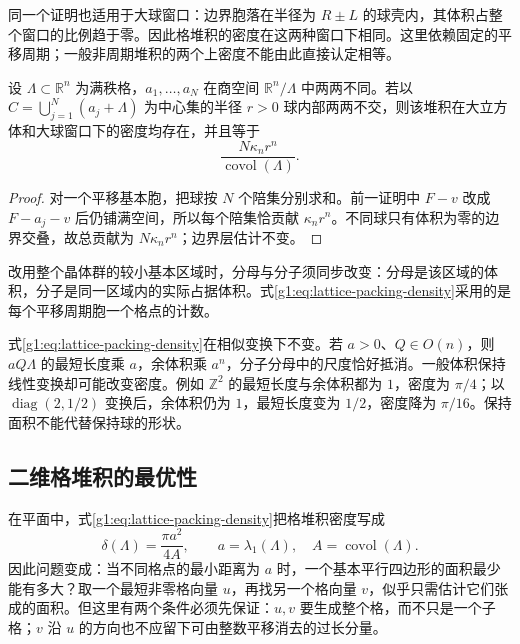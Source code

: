 同一个证明也适用于大球窗口：边界胞落在半径为 \(R\pm L\) 的球壳内，其体积占整个窗口的比例趋于零。因此格堆积的密度在这两种窗口下相同。这里依赖固定的平移周期；一般非周期堆积的两个上密度不能由此直接认定相等。

\begin{corollary}
	\label{g1:cor:periodic-packing-density}
	设 \(\Lambda\subset\mathbb R^n\) 为满秩格，\(a_1,\ldots,a_N\) 在商空间 \(\mathbb R^n/\Lambda\) 中两两不同。若以 \(C=\bigcup_{j=1}^N(a_j+\Lambda)\) 为中心集的半径 \(r>0\) 球内部两两不交，则该堆积在大立方体和大球窗口下的密度均存在，并且等于
	\[
		\frac{N\kappa_n r^n}{\operatorname{covol}(\Lambda)}.
	\]
\end{corollary}
\begin{proof}
	对一个平移基本胞，把球按 \(N\) 个陪集分别求和。前一证明中 \(F-v\) 改成 \(F-a_j-v\) 后仍铺满空间，所以每个陪集恰贡献 \(\kappa_n r^n\)。不同球只有体积为零的边界交叠，故总贡献为 \(N\kappa_n r^n\)；边界层估计不变。
\end{proof}

改用整个晶体群的较小基本区域时，分母与分子须同步改变：分母是该区域的体积，分子是同一区域内的实际占据体积。式\eqref{g1:eq:lattice-packing-density}采用的是每个平移周期胞一个格点的计数。

\ProseParagraphBreak

式\eqref{g1:eq:lattice-packing-density}在相似变换下不变。若 \(a>0\)、\(Q\in O(n)\)，则 \(aQ\Lambda\) 的最短长度乘 \(a\)，余体积乘 \(a^n\)，分子分母中的尺度恰好抵消。一般体积保持线性变换却可能改变密度。例如 \(\mathbb Z^2\) 的最短长度与余体积都为 \(1\)，密度为 \(\pi/4\)；以 \(\operatorname{diag}(2,1/2)\) 变换后，余体积仍为 \(1\)，最短长度变为 \(1/2\)，密度降为 \(\pi/16\)。保持面积不能代替保持球的形状。

\subsection{二维格堆积的最优性}
\label{g1:subsec:B04:04}

在平面中，式\eqref{g1:eq:lattice-packing-density}把格堆积密度写成
\[
	\delta(\Lambda)=\frac{\pi a^2}{4A},\qquad
	a=\lambda_1(\Lambda),\quad A=\operatorname{covol}(\Lambda).
\]
因此问题变成：当不同格点的最小距离为 \(a\) 时，一个基本平行四边形的面积最少能有多大？取一个最短非零格向量 \(u\)，再找另一个格向量 \(v\)，似乎只需估计它们张成的面积。但这里有两个条件必须先保证：\(u,v\) 要生成整个格，而不只是一个子格；\(v\) 沿 \(u\) 的方向也不应留下可由整数平移消去的过长分量。

\ProseParagraphBreak

